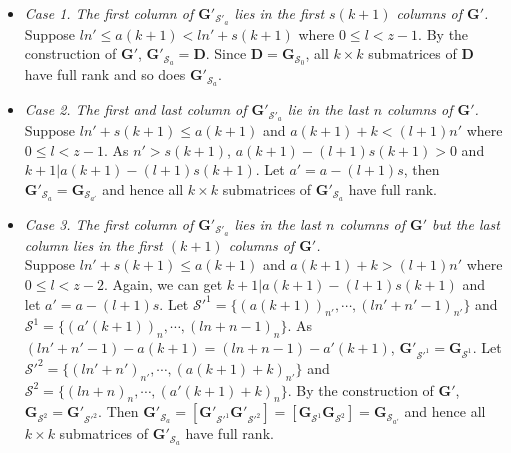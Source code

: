 \documentclass[journal,twocolumn]{IEEEtran}
\theoremstyle{definition}
\newcommand{\calS}{\mathcal{S}}
\newcommand{\bfG}{\mathbf{G}}
\newcommand{\bfD}{\mathbf{D}}
\begin{document}
\begin{itemize}
\item {\it Case 1. The first column of $\bfG'_{\calS'_a}$ lies in the first $s(k+1)$ columns of $\bfG'$.}\\
Suppose $ln'\le a(k+1)< ln'+s(k+1)$ where $0\le l<  z-1$. By the construction of $\bfG'$, $\bfG'_{\calS_a}=\bfD$. Since $\bfD = \bfG_{\calS_0}$, all $k\times k$ submatrices of $\bfD$ have full rank and so does $\bfG'_{\calS_a}$.

\item {\it Case 2. The first and last column of $\bfG'_{\calS'_a}$ lie in the last $n$ columns of $\bfG'$.}\\
Suppose  $ln'+s(k+1)\le a(k+1)$ and $ a(k+1)+k< (l+1)n'$ where $0\le l< z-1$. As $n'>s(k+1)$, $a(k+1)-(l+1)s(k+1)>0$ and $k+1|a(k+1)-(l+1)s(k+1)$. Let $a'=a-(l+1)s$, then $\bfG'_{\calS_a}=\bfG_{\calS_{a'}}$ and hence  all $k\times k$ submatrices of $\bfG'_{\calS_a}$ have full rank.

\item {\it Case 3. The first column of $\bfG'_{\calS'_a}$ lies in the last $n$ columns of $\bfG'$ but the last column lies in the first $(k+1)$ columns of $\bfG'$.}\\
Suppose  $ln'+s(k+1)\le a(k+1)$ and $ a(k+1)+k> (l+1)n'$ where $0\le l<z-2$. Again, we can get $k+1|a(k+1)-(l+1)s(k+1)$ and let $a'=a-(l+1)s$. Let $\calS'^1=\{(a(k+1))_{n'},\cdots, (ln'+n'-1)_{n'}\}$ and $\calS^1=\{(a'(k+1))_n,\cdots,(ln+n-1)_n\}$. As $(ln'+n'-1)-a(k+1)=(ln+n-1)-a'(k+1)$, $\bfG'_{\calS'^1}=\bfG_{\calS^1}$. Let $\calS'^2=\{(ln'+n')_{n'},\cdots,(a(k+1)+k)_{n'}\}$ and $\calS^2=\{(ln+n)_n,\cdots, (a'(k+1)+k)_n\}$. By the construction of $\bfG'$, $\bfG_{\calS^2}=\bfG'_{\calS'^2}$. Then $\bfG'_{\calS_a}=[\bfG'_{\calS'^1} \bfG'_{\calS'^2}]=[\bfG_{\calS^1} \bfG_{\calS^2}]=\bfG_{\calS_{a'}}$ and hence all $k\times k$ submatrices of $\bfG'_{\calS_a}$ have full rank.
\end{itemize}
%
\end{document}
